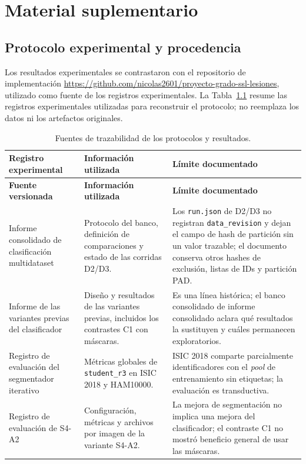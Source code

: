 \appendix
\chapter{Material suplementario}

\section{Protocolo experimental y procedencia}

Los resultados experimentales se contrastaron con el repositorio de implementación \url{https://github.com/nicolas2601/proyecto-grado-ssl-lesiones}, utilizado como fuente de los registros experimentales. La Tabla~\ref{tab:trazabilidad-experimental} resume las registros experimentales utilizadas para reconstruir el protocolo; no reemplaza los datos ni los artefactos originales.

\begingroup
\small
\singlespacing
\setlength{\tabcolsep}{3.5pt}
\renewcommand{\arraystretch}{1.18}
\begin{longtable}{@{}>{\raggedright\arraybackslash}p{}>{\raggedright\arraybackslash}p{}>{\raggedright\arraybackslash}p{}@{}}
\caption{Fuentes de trazabilidad de los protocolos y resultados.}
\label{tab:trazabilidad-experimental}\\
\toprule
\textbf{Registro experimental} & \textbf{Información utilizada} & \textbf{Límite documentado} \\
\midrule
\endfirsthead
\toprule
\textbf{Fuente versionada} & \textbf{Información utilizada} & \textbf{Límite documentado} \\
\midrule
\endhead
\bottomrule
\endfoot
Informe consolidado de clasificación multidataset &
Protocolo del banco, definición de comparaciones y estado de las corridas D2/D3. &
Los \texttt{run.json} de D2/D3 no registran \texttt{data\_revision} y dejan el campo de hash de partición sin un valor trazable; el documento conserva otros hashes de exclusión, listas de IDs y partición PAD. \\
\addlinespace[5pt]
Informe de las variantes previas del clasificador &
Diseño y resultados de las variantes previas, incluidos los contrastes C1 con máscaras. &
Es una línea histórica; el banco consolidado de informe consolidado aclara qué resultados la sustituyen y cuáles permanecen exploratorios. \\
\addlinespace[5pt]
Registro de evaluación del segmentador iterativo &
Métricas globales de \texttt{student\_r3} en ISIC 2018 y HAM10000. &
ISIC 2018 comparte parcialmente identificadores con el \textit{pool} de entrenamiento sin etiquetas; la evaluación es transductiva. \\
\addlinespace[5pt]
Registro de evaluación de S4-A2 &
Configuración, métricas y archivos por imagen de la variante S4-A2. &
La mejora de segmentación no implica una mejora del clasificador; el contraste C1 no mostró beneficio general de usar las máscaras. \\
\end{longtable}
\endgroup

